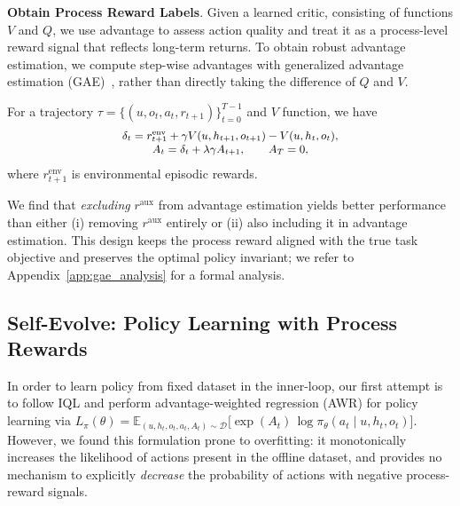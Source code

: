 \documentclass{article}
\theoremstyle{plain}
\theoremstyle{definition}
\theoremstyle{remark}
\begin{document}
\textbf{Obtain Process Reward Labels}. Given a learned critic, consisting of functions $V$ and $Q$, we use advantage to assess action quality and treat it as a process-level reward signal that reflects long-term returns. To obtain robust advantage estimation, we compute step-wise advantages with generalized advantage estimation (GAE)~\citep{gae}, rather than directly taking the difference of $Q$ and $V$.

For a trajectory $\tau=\{(u, o_t,a_t,r_{t+1})\}_{t=0}^{T-1}$ and $V$ function, we have
\begin{equation}
\small
\begin{array}{cc}
\delta_t = r^{\text{env}}_{t+1} + \gamma V(u, h_{t+1}, o_{t+1}) - V(u, h_t, o_t),
\\
A_t = \delta_t + \lambda \gamma A_{t+1}, \qquad A_T=0,
\end{array}
\label{eq:gae}
\end{equation}
where $r^{\text{env}}_{t+1}$ is environmental episodic rewards.

We find that \emph{excluding} $r^{\text{aux}}$ from advantage estimation yields better performance than either (i) removing $r^{\text{aux}}$ entirely or (ii) also including it in advantage estimation. This design keeps the process reward aligned with the true task objective and preserves the optimal policy invariant; we refer to Appendix~\ref{app:gae_analysis} for a formal analysis.





\subsection{Self-Evolve: Policy Learning with Process Rewards}

In order to learn policy from fixed dataset in the inner-loop, our first attempt is to follow IQL and perform advantage-weighted regression (AWR) for policy learning via $L_\pi(\theta)=\mathbb{E}_{(u,h_t,o_t,a_t,A_t)\sim\mathcal{D}}\Big[\exp(A_t)\,\log \pi_\theta(a_t\mid u,h_t,o_t)\Big]$.
However, we found this formulation prone to overfitting: it monotonically increases the likelihood of actions present in the offline dataset, and provides no mechanism to explicitly \emph{decrease} the probability of actions with negative process-reward signals. 
\end{document}
